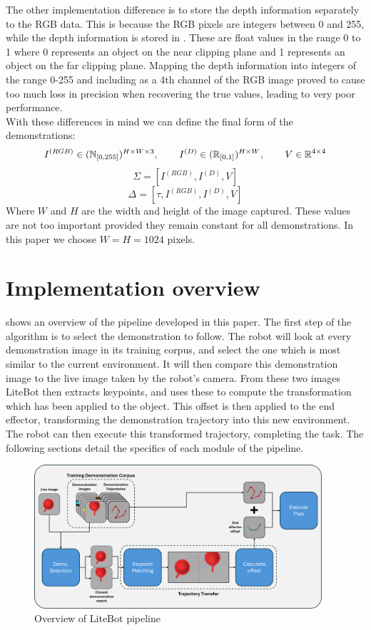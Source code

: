 The other implementation difference is to store the depth information separately to the RGB data. This is because the RGB pixels are integers between 0 and 255, while the depth information is stored in  \cite{ndc}. These are float values in the range 0 to 1 where 0 represents an object on the near clipping plane and 1 represents an object on the far clipping plane. Mapping the depth information into integers of the range 0-255 and including as a 4th channel of the RGB image proved to cause too much loss in precision when recovering the true values, leading to very poor performance.\\

With these differences in mind we can define the final form of the demonstrations:
$$I^{(RGB)} \in (\operatorname{\mathbb{N}}_{[0,255]})^{H \times W \times 3}, \operatorname{\operatorname{\: \: \: \:} \operatorname{\: \: \: \:}}
I^{(D)} \in (\operatorname{\mathbb{R}}_{[0,1]})^{H \times W}, \operatorname{\operatorname{\: \: \: \:} \operatorname{\: \: \: \:}}
V \in \operatorname{\mathbb{R}}^{4 \times 4}$$
$$\Sigma = [I^{(RGB)}, I^{(D)}, V]$$
$$\Delta = [\tau, I^{(RGB)}, I^{(D)}, V]$$
Where $W$ and $H$ are the width and height of the image captured. These values are not too important provided they remain constant for all demonstrations. In this paper we choose $W=H=1024$ pixels.

\section{Implementation overview}
\label{sec:implementation}

 shows an overview of the pipeline developed in this paper. The first step of the algorithm is to select the demonstration to follow. The robot will look at every demonstration image in its training corpus, and select the one which is most similar to the current environment. It will then compare this demonstration image to the live image taken by the robot's camera. From these two images LiteBot then extracts keypoints, and uses these to compute the transformation which has been applied to the object. This offset is then applied to the end effector, transforming the demonstration trajectory into this new environment. The robot can then execute this transformed trajectory, completing the task. The following sections detail the specifics of each module of the pipeline.

\begin{figure}[h]
    \centering
    \includegraphics[width=0.95\textwidth]{figures/pipeline.png}
    \caption{Overview of LiteBot pipeline}
    \label{fig:pipeline}
\end{figure}

